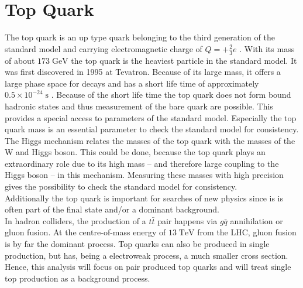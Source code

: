 \section{Top Quark}
	The top quark is an up type quark belonging to the third generation of the standard model and carrying electromagnetic charge of $Q=+\frac{2}{3}e$ \cite{pdg2016}. With its mass of about $173\;\text{GeV}$ the top quark is the heaviest particle in the standard model. It was first discovered in 1995 at Tevatron. 
	Because of its large mass, it offers a large phase space for decays and  has a short life time of approximately $0.5 \times 10^{-24}\;\text{s}$ \cite{pdg2016}. Because of the short life time the top quark does not form bound hadronic states and thus measurement of the bare quark are possible. This provides a special access to parameters of the standard model. Especially the top quark mass is an essential parameter to check the standard model for consistency. The Higgs mechanism relates the masses of the top quark with the masses of the W and Higgs boson. This could be done, because the top quark plays an extraordinary role due to its high mass -- and therefore large coupling to the Higgs boson -- in this mechanism. Measuring these masses with high precision gives the possibility to check the standard model for consistency. 
	\\
	Additionally the top quark is important for searches of new physics since is is often part of the final state and/or a dominant background. 
	\\
	In hadron colliders, the production of a $t\bar{t}$ pair happens via $g\bar{q}$ annihilation or gluon fusion. At the centre-of-mass energy of $13\;\text{TeV}$ from the LHC, gluon fusion is by far the dominant process. Top quarks can also be produced in single production, but has, being a electroweak process, a much smaller cross section. Hence, this analysis will focus on pair produced top quarks and will treat single top production as a background process.

